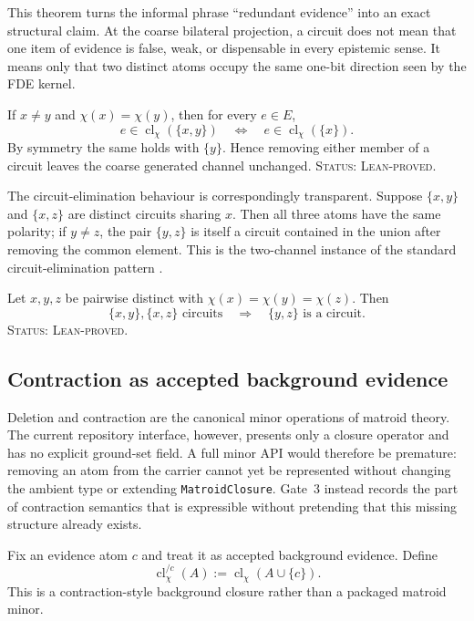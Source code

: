 This theorem turns the informal phrase ``redundant evidence'' into an exact
structural claim. At the coarse bilateral projection, a circuit does not mean
that one item of evidence is false, weak, or dispensable in every epistemic
sense. It means only that two distinct atoms occupy the same one-bit direction
seen by the FDE kernel.

\begin{proposition}
If \(x\neq y\) and \(\chi(x)=\chi(y)\), then for every \(e\in E\),
\[
  e\in\operatorname{cl}_{\chi}(\{x,y\})
  \quad\Longleftrightarrow\quad
  e\in\operatorname{cl}_{\chi}(\{x\}).
\]
By symmetry the same holds with \(\{y\}\). Hence removing either member of a
circuit leaves the coarse generated channel unchanged.
\textup{\textsc{Status: Lean-proved.}}
\end{proposition}

The circuit-elimination behaviour is correspondingly transparent. Suppose
\(\{x,y\}\) and \(\{x,z\}\) are distinct circuits sharing \(x\). Then all three
atoms have the same polarity; if \(y\neq z\), the pair \(\{y,z\}\) is itself a
circuit contained in the union after removing the common element. This is the
two-channel instance of the standard circuit-elimination pattern
\cite{Oxley2011}.

\begin{proposition}
Let \(x,y,z\) be pairwise distinct with
\(\chi(x)=\chi(y)=\chi(z)\). Then
\[
  \{x,y\},\{x,z\}\text{ circuits}
  \quad\Longrightarrow\quad
  \{y,z\}\text{ is a circuit}.
\]
\textup{\textsc{Status: Lean-proved.}}
\end{proposition}

\subsection{Contraction as accepted background evidence}

Deletion and contraction are the canonical minor operations of matroid theory.
The current repository interface, however, presents only a closure operator and
has no explicit ground-set field. A full minor API would therefore be premature:
removing an atom from the carrier cannot yet be represented without changing the
ambient type or extending \texttt{MatroidClosure}. Gate~3 instead records the
part of contraction semantics that is expressible without pretending that this
missing structure already exists.

Fix an evidence atom \(c\) and treat it as accepted background evidence. Define
\[
  \operatorname{cl}_{\chi}^{/c}(A)
  :=\operatorname{cl}_{\chi}(A\cup\{c\}).
\]
This is a contraction-style background closure rather than a packaged matroid
minor.

